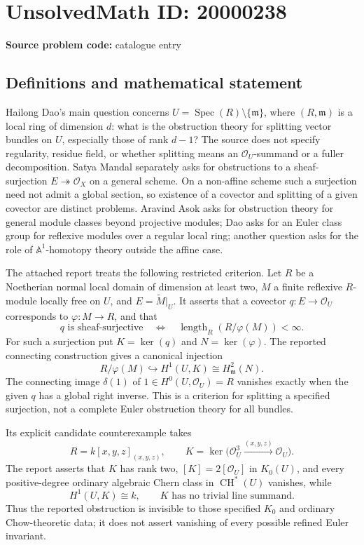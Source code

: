 \documentclass[11pt]{article}
\newcommand{\A}{\mathbb{A}}
\begin{document}
\section*{UnsolvedMath ID: 20000238}
\textbf{Source problem code:} catalogue entry
\subsection{Definitions and mathematical statement}
Hailong Dao's main question concerns \(U=\operatorname{Spec}(R)\setminus\{\mathfrak m\}\), where \((R,\mathfrak m)\) is a local ring of dimension \(d\): what is the obstruction theory for splitting vector bundles on \(U\), especially those of rank \(d-1\)? The source does not specify regularity, residue field, or whether splitting means an \(\mathcal O_U\)-summand or a fuller decomposition. Satya Mandal separately asks for obstructions to a sheaf-surjection \(E\twoheadrightarrow\mathcal O_X\) on a general scheme. On a non-affine scheme such a surjection need not admit a global section, so existence of a covector and splitting of a given covector are distinct problems. Aravind Asok asks for obstruction theory for general module classes beyond projective modules; Dao asks for an Euler class group for reflexive modules over a regular local ring; another question asks for the role of \(\A^1\)-homotopy theory outside the affine case.

The attached report treats the following restricted criterion. Let \(R\) be a Noetherian normal local domain of dimension at least two, \(M\) a finite reflexive \(R\)-module locally free on \(U\), and \(E=\widetilde M|_U\). It asserts that a covector \(q:E\to\mathcal O_U\) corresponds to \(\varphi:M\to R\), and that
\[
q\text{ is sheaf-surjective}\quad\Longleftrightarrow\quad
\operatorname{length}_R(R/\varphi(M))<\infty.
\]
For such a surjection put \(K=\ker(q)\) and \(N=\ker(\varphi)\). The reported connecting construction gives a canonical injection
\[
R/\varphi(M)\hookrightarrow H^1(U,K)\cong H^2_{\mathfrak m}(N).
\]
The connecting image \(\delta(1)\) of \(1\in H^0(U,\mathcal O_U)=R\) vanishes exactly when the given \(q\) has a global right inverse. This is a criterion for splitting a specified surjection, not a complete Euler obstruction theory for all bundles.

Its explicit candidate counterexample takes
\[
R=k[x,y,z]_{(x,y,z)},\qquad
K=\ker\bigl(\mathcal O_U^3\xrightarrow{(x,y,z)}\mathcal O_U\bigr).
\]
The report asserts that \(K\) has rank two, \([K]=2[\mathcal O_U]\) in \(K_0(U)\), and every positive-degree ordinary algebraic Chern class in \(\operatorname{CH}^*(U)\) vanishes, while
\[
H^1(U,K)\cong k,\qquad K\text{ has no trivial line summand}.
\]
Thus the reported obstruction is invisible to those specified \(K_0\) and ordinary Chow-theoretic data; it does not assert vanishing of every possible refined Euler invariant.
\end{document}
